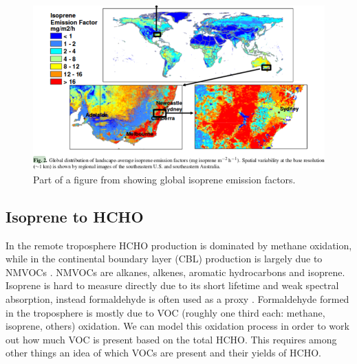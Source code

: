     \begin{figure}
      \includegraphics[width=\textwidth]{Figures/MeganIsoprene1.png}
      \caption{ Part of a figure from \citet{Guenther2006} showing global isoprene emission factors. }
      \label{ch_LitRev:fig:meganisoprene}
    \end{figure}
    
  \subsection{Isoprene to HCHO}
    \label{ch_LitRev:sec:IsopFromHCHO}
    In the remote troposphere HCHO production is dominated by methane oxidation, while in the continental boundary layer (CBL) production is largely due to NMVOCs \citep{Abbot2003, Kefauver2014}.
    NMVOCs are alkanes, alkenes, aromatic hydrocarbons and isoprene.
    Isoprene is hard to measure directly due to its short lifetime and weak spectral absorption, instead formaldehyde is often used as a proxy \citep{Millet2006, Fu2007, Dufour2009, Marais2012, bauwens2013satellite, Kefauver2014, Bauwens2016}.
    Formaldehyde formed in the troposphere is mostly due to VOC (roughly one third each: methane, isoprene, others) oxidation.
    We can model this oxidation process in order to work out how much VOC is present based on the total HCHO.
    This requires among other things an idea of which VOCs are present and their yields of HCHO.
    
